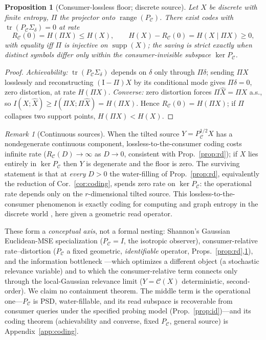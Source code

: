 \documentclass[lettersize,onecolumn]{IEEEtran}
\newtheorem{proposition}{Proposition}
\theoremstyle{definition}
\theoremstyle{remark}
\newtheorem*{remark}{Remark}
\newcommand{\PC}{P_{\mathcal{C}}}
\newcommand{\Sd}{\Sigma_{\delta}}
\newcommand{\tr}{\operatorname{tr}}
\begin{document}
\begin{proposition}[Consumer-lossless floor; discrete source]\label{prop:floor}
Let $X$ be discrete with finite entropy, $\Pi$ the projector onto
$\operatorname{range}(\PC)$. There exist codes with $\tr(\PC\Sd)=0$ at rate
\[
R_{\mathcal{C}}(0)=H(\Pi X)\le H(X),\qquad H(X)-R_{\mathcal{C}}(0)=H(X\mid\Pi X)\ge0,
\]
with equality iff $\Pi$ is injective on $\operatorname{supp}(X)$; the saving is
strict exactly when distinct symbols differ only within the consumer-invisible
subspace $\ker\PC$.
\end{proposition}
\begin{proof}
\emph{Achievability:} $\tr(\PC\Sd)$ depends on $\delta$ only through $\Pi\delta$;
sending $\Pi X$ losslessly and reconstructing $(\mathrm I-\Pi)X$ by its conditional
mode gives $\Pi\delta=0$, zero distortion, at rate $H(\Pi X)$. \emph{Converse:} zero
distortion forces $\Pi\hat X=\Pi X$ a.s., so $I(X;\hat X)\ge I(\Pi X;\Pi\hat X)=
H(\Pi X)$. Hence $R_{\mathcal{C}}(0)=H(\Pi X)$; if $\Pi$ collapses two support points,
$H(\Pi X)<H(X)$.
\end{proof}
\begin{remark}[Continuous sources]
When the tilted source $Y=\PC^{1/2}X$ has a nondegenerate continuous component,
lossless-to-the-consumer coding costs infinite rate ($R_{\mathcal{C}}(D)\to\infty$ as
$D\to0$, consistent with Prop.~\ref{prop:rd}); if $X$ lies entirely in $\ker\PC$ then
$Y$ is degenerate and the floor is zero. The surviving statement is
that at \emph{every} $D>0$ the water-filling of Prop.~\ref{prop:rd}, equivalently the
reduction of Cor.~\ref{cor:coding}, spends zero rate on $\ker\PC$: the operational
rate depends only on the $r$-dimensional tilted source. This lossless-to-the-consumer
phenomenon is exactly coding for computing and graph entropy in the discrete world
\cite{korner1973,orlitsky2001}, here given a geometric read operator.
\end{remark}

These form a \emph{conceptual axis}, not a formal nesting: Shannon's Gaussian
Euclidean-MSE specialization ($\PC=I$, the isotropic observer), consumer-relative
rate--distortion ($\PC$ a fixed
geometric, \emph{identifiable} operator, Props.~\ref{prop:rd},\ref{prop:floor}), and
the information bottleneck \cite{tishby1999}---which optimizes a different object (a
stochastic relevance variable) and to which the consumer-relative term connects only
through the local-Gaussian relevance limit ($Y=\mathcal{C}(X)$ deterministic,
second-order). We claim no containment theorem. The middle term is the operational
one---$\PC$ is PSD, water-fillable, and its read subspace is recoverable from consumer
queries under the specified probing model (Prop.~\ref{prop:id})---and its coding
theorem (achievability and converse, fixed
$\PC$, general source) is Appendix~\ref{app:coding}.
\end{document}
